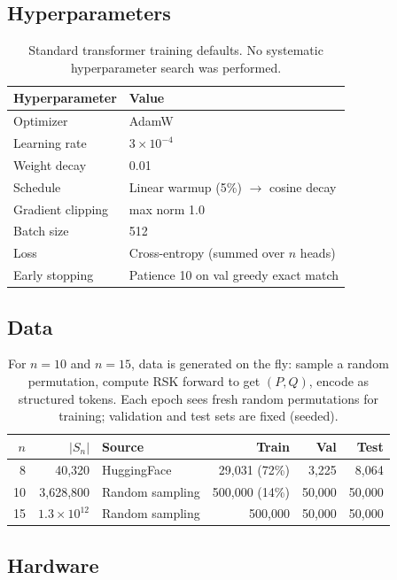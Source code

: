 \documentclass[11pt,a4paper]{article}
\begin{document}
\subsection{Hyperparameters}

\begin{table}[h]
\centering
\begin{tabular}{ll}
\toprule
Hyperparameter & Value \\
\midrule
Optimizer & AdamW \\
Learning rate & $3 \times 10^{-4}$ \\
Weight decay & 0.01 \\
Schedule & Linear warmup (5\%) $\to$ cosine decay \\
Gradient clipping & max norm 1.0 \\
Batch size & 512 \\
Loss & Cross-entropy (summed over $n$ heads) \\
Early stopping & Patience 10 on val greedy exact match \\
\bottomrule
\end{tabular}
\caption{Standard transformer training defaults. No systematic hyperparameter search was performed.}
\end{table}

\subsection{Data}

\begin{table}[h]
\centering
\begin{tabular}{rrlrrr}
\toprule
$n$ & $|S_n|$ & Source & Train & Val & Test \\
\midrule
8 & 40{,}320 & HuggingFace~\cite{acdrepo} & 29{,}031 (72\%) & 3{,}225 & 8{,}064 \\
10 & 3{,}628{,}800 & Random sampling & 500{,}000 (14\%) & 50{,}000 & 50{,}000 \\
15 & $1.3 \times 10^{12}$ & Random sampling & 500{,}000 & 50{,}000 & 50{,}000 \\
\bottomrule
\end{tabular}
\caption{For $n=10$ and $n=15$, data is generated on the fly: sample a random permutation, compute RSK forward to get $(P, Q)$, encode as structured tokens. Each epoch sees fresh random permutations for training; validation and test sets are fixed (seeded).}
\end{table}

\subsection{Hardware}
\end{document}
